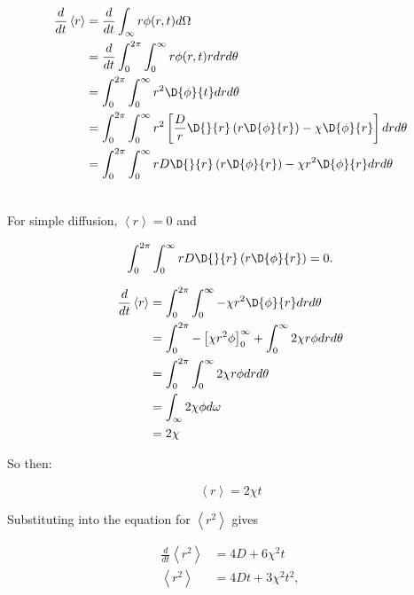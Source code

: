 \begin{equation}
\begin{split}
\frac{d}{dt} \left<r\right> &= \frac{d}{dt}\int_{\infty}r \phi(r,t) d\Omega \\
                              &= \frac{d}{dt} \int_0^{2\pi}\int_0^{\infty} r \phi(r,t)r dr d\theta \\
                              &= \int_0^{2\pi} \int_0^{\infty} r^2 \D{\phi}{t} dr d\theta \\
                              &= \int_0^{2\pi} \int_0^{\infty} r^2 \left[ \frac{D}{r} \D{}{r}\left(r \D{\phi}{r}\right)-\chi\D{\phi}{r} \right] dr d\theta \\
                              &= \int_0^{2\pi} \int_0^{\infty} rD  \D{}{r}\left(r \D{\phi}{r}\right) -  \chi r^2 \D{\phi}{r} dr d\theta \\
\nonumber
\end{split}
\end{equation}


For simple diffusion, $\left<r\right> = 0$ and


\begin{equation}
\int_0^{2\pi} \int_0^{\infty} rD  \D{}{r}\left(r \D{\phi}{r}\right) = 0 .
\end{equation}

\begin{equation}
\begin{split}
\frac{d}{dt} \left<r\right> &= \int_0^{2\pi} \int_0^{\infty} -  \chi r^2 \D{\phi}{r} dr d\theta \\
                            &= \int_0^{2\pi} - \left[ \chi r^2 \phi \right]_0^{\infty} + \int_0^{\infty} 2 \chi r \phi dr d\theta \\
                            &= \int_0^{2\pi} \int_0^{\infty} 2 \chi r \phi dr d\theta \\
                            &= \int_{\infty} 2 \chi \phi d\omega \\
                            &= 2\chi
\nonumber
\end{split}
\end{equation}

So then:

\begin{equation}
\left<r\right> = 2\chi t
\nonumber
\end{equation}

Substituting into the equation for $\left<r^2\right>$ gives

\begin{equation}
\begin{split}
\frac{d}{dt} \left<r^2\right> &= 4D + 6\chi^2t \\
\left<r^2\right>              &= 4Dt + 3\chi^2t^2 ,
\nonumber
\end{split}
\end{equation}
%


